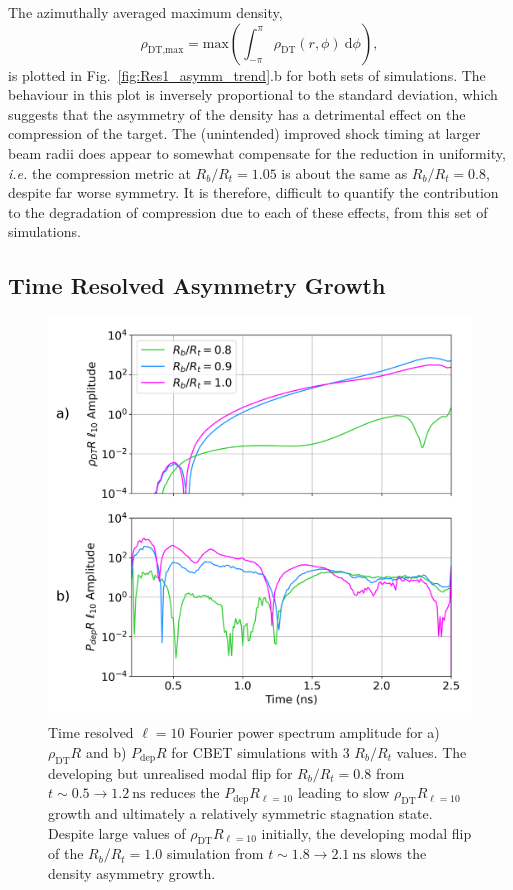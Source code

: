 The azimuthally averaged maximum density,
\begin{equation}
    \rho_{\text{DT,max}} = \text{max}\left( \int_{-\pi}^{\pi} \rho_{\text{DT}}(r,\phi)\ \text{d}\phi \right),
\end{equation}
is plotted in Fig.~\ref{fig:Res1_asymm_trend}.b for both sets of simulations.
The behaviour in this plot is inversely proportional to the standard deviation, which suggests that the asymmetry of the density has a detrimental effect on the compression of the target.
The (unintended) improved shock timing at larger beam radii does appear to somewhat compensate for the reduction in uniformity, \textit{i.e.} the compression metric at $R_b/R_t=1.05$ is about the same as $R_b/R_t=0.8$, despite far worse symmetry.
It is therefore, difficult to quantify the contribution to the degradation of compression due to each of these effects, from this set of simulations.

\subsection{Time Resolved Asymmetry Growth}%
\label{sec:Res1_time_res_growth}

\begin{figure}[t!]
    \includegraphics[width=0.75\linewidth]{Results1/Images/RbRts_mode10_growth.png}
    \centering
    \caption{Time resolved $\ell=10$ Fourier power spectrum amplitude for a) $\rho_{\text{DT}}R$ and b) $P_{\text{dep}}R$ for \ac{CBET} simulations with 3 $R_b/R_t$ values.
    The developing but unrealised modal flip for $R_b/R_t=0.8$ from $t \sim 0.5\rightarrow 1.2\ \text{ns}$ reduces the $P_{\text{dep}}R_{\ell=10}$ leading to slow $\rho_{\text{DT}}R_{\ell=10}$ growth and ultimately a relatively symmetric stagnation state.
    Despite large values of $\rho_{\text{DT}}R_{\ell=10}$ initially, the developing modal flip of the $R_b/R_t=1.0$ simulation from $t \sim 1.8\rightarrow 2.1\ \text{ns}$ slows the density asymmetry growth.}%
    \label{fig:Res1_mode10_growths}
\end{figure}

